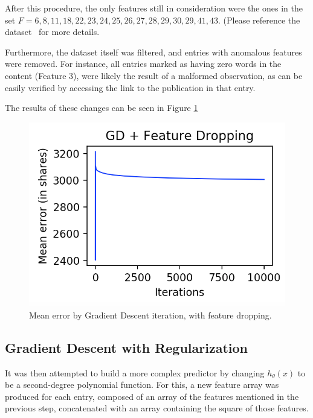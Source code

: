 \documentclass[10pt,twocolumn,letterpaper]{article}
\newcommand{\CITEONE}[2]{\mbox{#1 \cite{#2}}}
\begin{document}
After this procedure, the only features still in consideration were the ones in the set $F = {6,8,11,18,22,23,24,25,26,27,28,29,30,29,41,43}$. (Please reference the \CITEONE{dataset}{Dataset} for more details.

Furthermore, the dataset itself was filtered, and entries with anomalous features were removed. For instance, all entries marked as having zero words in the content (Feature 3), were likely the result of a malformed observation, as can be easily verified by accessing the link to the publication in that entry.

The results of these changes can be seen in Figure \ref{fig:gd2}

\begin{figure}
\begin{center}
	\includegraphics[width=0.99\columnwidth]{pics/gd2.png}
	\caption{Mean error by Gradient Descent iteration, with feature dropping.\label{fig:gd2}}   
\end{center} 
\end{figure}

\subsection{Gradient Descent with Regularization}
\label{sec:gdr}

It was then attempted to build a more complex predictor by changing $h_\theta(x)$ to be a second-degree polynomial function. For this, a new feature array was produced for each entry, composed of an array of the features mentioned in the previous step, concatenated with an array containing the square of those features.
\end{document}
